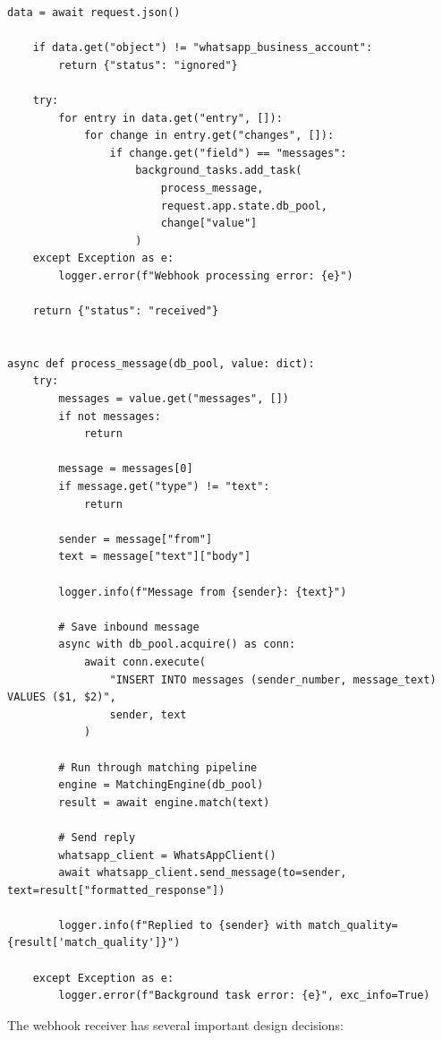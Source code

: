 \documentclass[12pt, a4paper]{report}
\begin{document}
\begin{lstlisting}[style=pythonstyle, caption={WhatsApp Webhook Receiver --- Full Implementation}]
    data = await request.json()

    if data.get("object") != "whatsapp_business_account":
        return {"status": "ignored"}

    try:
        for entry in data.get("entry", []):
            for change in entry.get("changes", []):
                if change.get("field") == "messages":
                    background_tasks.add_task(
                        process_message,
                        request.app.state.db_pool,
                        change["value"]
                    )
    except Exception as e:
        logger.error(f"Webhook processing error: {e}")

    return {"status": "received"}


async def process_message(db_pool, value: dict):
    try:
        messages = value.get("messages", [])
        if not messages:
            return

        message = messages[0]
        if message.get("type") != "text":
            return

        sender = message["from"]
        text = message["text"]["body"]

        logger.info(f"Message from {sender}: {text}")

        # Save inbound message
        async with db_pool.acquire() as conn:
            await conn.execute(
                "INSERT INTO messages (sender_number, message_text) VALUES ($1, $2)",
                sender, text
            )

        # Run through matching pipeline
        engine = MatchingEngine(db_pool)
        result = await engine.match(text)

        # Send reply
        whatsapp_client = WhatsAppClient()
        await whatsapp_client.send_message(to=sender, text=result["formatted_response"])

        logger.info(f"Replied to {sender} with match_quality={result['match_quality']}")

    except Exception as e:
        logger.error(f"Background task error: {e}", exc_info=True)
\end{lstlisting}

The webhook receiver has several important design decisions:
\end{document}
